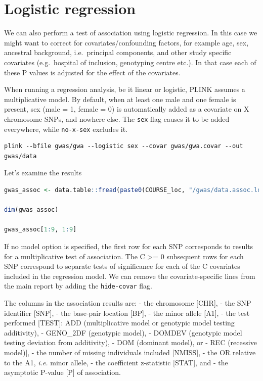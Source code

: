 \documentclass[
]{book}
\newcommand{\passthrough}[1]{#1}
\begin{document}
\hypertarget{logistic-regression}{%
\section{Logistic regression}\label{logistic-regression}}

We can also perform a test of association using logistic regression. In this case we might want to correct for covariates/confounding factors, for example age, sex, ancestral background, i.e.~principal components, and other study specific covariates (e.g.~hospital of inclusion, genotyping centre etc.). In that case each of these P values is adjusted for the effect of the covariates.

When running a regression analysis, be it linear or logistic, PLINK assumes a multiplicative model. By default, when at least one male and one female is present, sex (male = 1, female = 0) is automatically added as a covariate on X chromosome SNPs, and nowhere else. The \passthrough{\lstinline!sex!} flag causes it to be added everywhere, while \passthrough{\lstinline!no-x-sex!} excludes it.

\begin{lstlisting}
plink --bfile gwas/gwa --logistic sex --covar gwas/gwa.covar --out gwas/data
\end{lstlisting}

Let's examine the results

\begin{lstlisting}[language=R]
gwas_assoc <- data.table::fread(paste0(COURSE_loc, "/gwas/data.assoc.logistic"))

dim(gwas_assoc)

gwas_assoc[1:9, 1:9]
\end{lstlisting}

If no model option is specified, the first row for each SNP corresponds to results for a multiplicative test of association. The C \textgreater= 0 subsequent rows for each SNP correspond to separate tests of significance for each of the C covariates included in the regression model. We can remove the covariate-specific lines from the main report by adding the \passthrough{\lstinline!hide-covar!} flag.

The columns in the association results are:
- the chromosome {[}CHR{]},
- the SNP identifier {[}SNP{]},
- the base-pair location {[}BP{]},
- the minor allele {[}A1{]},
- the test performed {[}TEST{]}: ADD (multiplicative model or genotypic model testing additivity),
- GENO\_2DF (genotypic model),
- DOMDEV (genotypic model testing deviation from additivity),
- DOM (dominant model), or
- REC (recessive model){]},
- the number of missing individuals included {[}NMISS{]},
- the OR relative to the A1, \emph{i.e.} minor allele,
- the coefficient z-statistic {[}STAT{]}, and
- the asymptotic P-value {[}P{]} of association.
\end{document}
